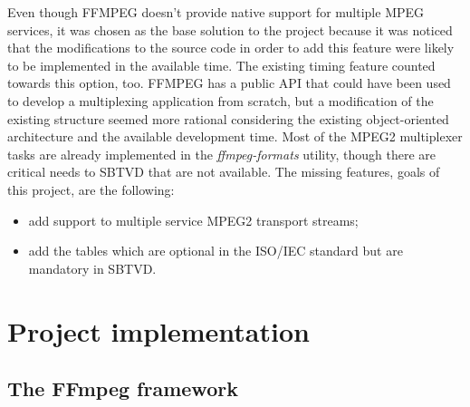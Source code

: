 \documentclass[
	12pt,				%
	openright,			%
	twoside,			%
	a4paper,			%
	brazil,
	french,				%
	english
	]{abntex2}
\begin{document}
Even though FFMPEG doesn't provide native support for multiple MPEG services, it was chosen as the base solution to the project because it was noticed that the modifications to the source code in order to add this feature were likely to be implemented in the available time. The existing timing feature counted towards this option, too. FFMPEG has a public API that could have been used to develop a multiplexing application from scratch, but a modification of the existing structure seemed more rational considering the existing object-oriented architecture and the available development time. Most of the MPEG2 multiplexer tasks are already implemented in the \textit{ffmpeg-formats} utility, though there are critical needs to SBTVD that are not available. The missing features, goals of this project, are the following:

\begin{itemize}
\item{add support to multiple service MPEG2 transport streams;}
\item{add the tables which are optional in the ISO/IEC standard but are mandatory in SBTVD.}
\end{itemize}


\chapter{Project implementation}
\label{implementation}

\section{The FFmpeg framework}
\end{document}
